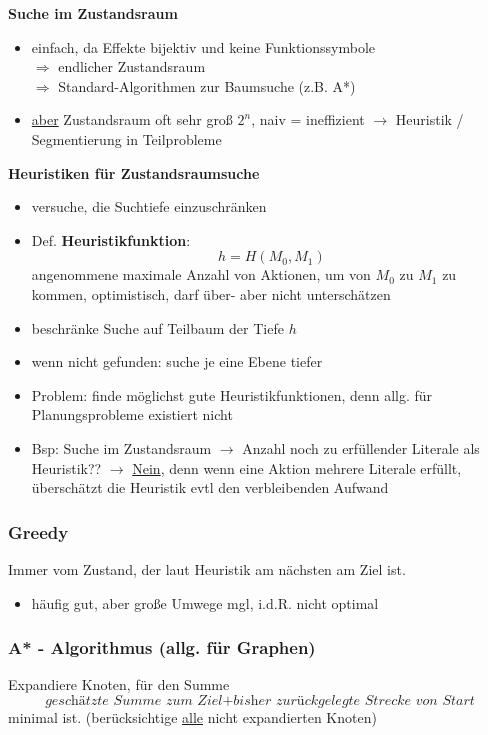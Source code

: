 \textbf{Suche im Zustandsraum}
\begin{itemize}
\item einfach, da Effekte bijektiv und keine Funktionssymbole \\ $\Rightarrow$ endlicher Zustandsraum \\ $\Rightarrow$ Standard-Algorithmen zur Baumsuche (z.B. A*)
\item \underline{aber} Zustandsraum oft sehr groß $2^n$, naiv = ineffizient $\to$ Heuristik / Segmentierung in Teilprobleme
\end{itemize}

\textbf{Heuristiken für Zustandsraumsuche}
\begin{itemize}
\item versuche, die Suchtiefe einzuschränken
\item Def. \textbf{Heuristikfunktion}: $$h = H(M_0,M_1)$$ angenommene maximale Anzahl von Aktionen, um von $M_0$ zu $M_1$ zu kommen, optimistisch, darf über- aber nicht unterschätzen
\item beschränke Suche auf Teilbaum der Tiefe $h$
\item wenn nicht gefunden: suche je eine Ebene tiefer
\item Problem: finde möglichst gute Heuristikfunktionen, denn allg. für Planungsprobleme existiert nicht
\item Bsp: Suche im Zustandsraum $\to$ Anzahl noch zu erfüllender Literale als Heuristik?? $\to$ \underline{Nein}, denn wenn eine Aktion mehrere Literale erfüllt, überschätzt die Heuristik evtl den verbleibenden Aufwand
\end{itemize}

\subsubsection{Greedy}

Immer vom Zustand, der laut Heuristik am nächsten am Ziel ist.

\begin{itemize}
	\item häufig gut, aber große Umwege mgl, i.d.R. nicht optimal
\end{itemize}

\subsubsection{A* - Algorithmus (allg. für Graphen)}

Expandiere Knoten, für den Summe $$\textit{geschätzte Summe zum Ziel} + \textit{bisher zurückgelegte Strecke von Start}$$
minimal ist.
(berücksichtige \underline{alle} nicht expandierten Knoten)

